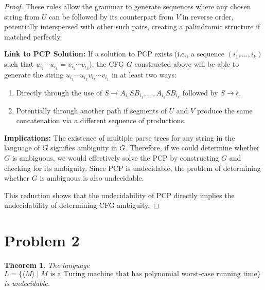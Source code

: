 \documentclass[a4paper,10pt]{article}
\newtheorem{theorem}{Theorem}
\begin{document}
\begin{proof}
These rules allow the grammar to generate sequences where any chosen string from \( U \) can be followed by its counterpart from \( V \) in reverse order, potentially interspersed with other such pairs, creating a palindromic structure if matched perfectly.

\textbf{Link to PCP Solution:}
If a solution to PCP exists (i.e., a sequence \( (i_1, \ldots, i_k) \) such that \( u_{i_1} \cdots u_{i_k} = v_{i_1} \cdots v_{i_k} \)), the CFG \( G \) constructed above will be able to generate the string \( u_{i_1} \cdots u_{i_k} v_{i_k} \cdots v_{i_1} \) in at least two ways:
\begin{enumerate}
    \item Directly through the use of \( S \rightarrow A_{i_1} S B_{i_1}, \ldots, A_{i_k} S B_{i_k} \) followed by \( S \rightarrow \epsilon \).
    \item Potentially through another path if segments of \( U \) and \( V \) produce the same concatenation via a different sequence of productions.
\end{enumerate}

\textbf{Implications:}
The existence of multiple parse trees for any string in the language of \( G \) signifies ambiguity in \( G \). Therefore, if we could determine whether \( G \) is ambiguous, we would effectively solve the PCP by constructing \( G \) and checking for its ambiguity. Since PCP is undecidable, the problem of determining whether \( G \) is ambiguous is also undecidable.

This reduction shows that the undecidability of PCP directly implies the undecidability of determining CFG ambiguity.
\end{proof}
\pagebreak

\section{Problem 2}
\begin{theorem}
The language $L = \{ \langle M \rangle \mid M \text{ is a Turing machine that has polynomial worst-case running time} \}$ is undecidable.
\end{theorem}
\end{document}
